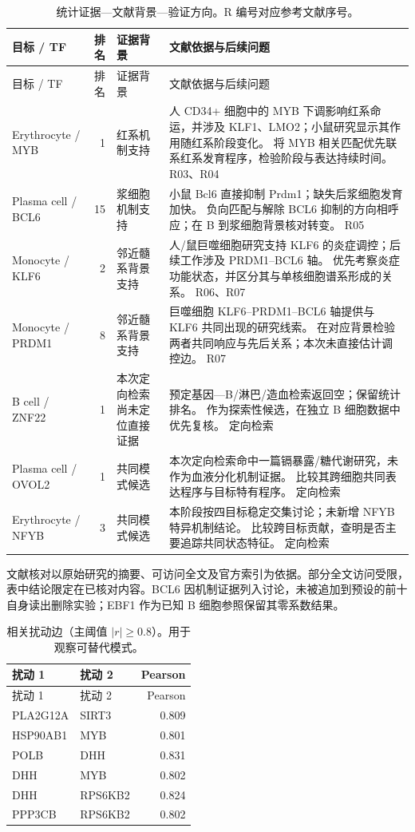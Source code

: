 {\footnotesize\linespread{1}\selectfont\setlength{\tabcolsep}{4pt}\renewcommand{\arraystretch}{1.08}\begin{longtable}{p{2.6cm}rp{2.6cm}p{9cm}}\caption{统计证据—文献背景—验证方向。R 编号对应参考文献序号。}\\\toprule 目标 / TF & 排名 & 证据背景 & 文献依据与后续问题\\\midrule\endfirsthead\toprule 目标 / TF & 排名 & 证据背景 & 文献依据与后续问题\\\midrule\endhead
Erythrocyte / MYB & 1 & 红系机制支持 & 人 CD34+ 细胞中的 MYB 下调影响红系命运，并涉及 KLF1、LMO2；小鼠研究显示其作用随红系阶段变化。 将 MYB 相关匹配优先联系红系发育程序，检验阶段与表达持续时间。 R03、R04\\
Plasma cell / BCL6 & 15 & 浆细胞机制支持 & 小鼠 Bcl6 直接抑制 Prdm1；缺失后浆细胞发育加快。 负向匹配与解除 BCL6 抑制的方向相呼应；在 B 到浆细胞背景核对转变。 R05\\
Monocyte / KLF6 & 2 & 邻近髓系背景支持 & 人/鼠巨噬细胞研究支持 KLF6 的炎症调控；后续工作涉及 PRDM1–BCL6 轴。 优先考察炎症功能状态，并区分其与单核细胞谱系形成的关系。 R06、R07\\
Monocyte / PRDM1 & 8 & 邻近髓系背景支持 & 巨噬细胞 KLF6–PRDM1–BCL6 轴提供与 KLF6 共同出现的研究线索。 在对应背景检验两者共同响应与先后关系；本次未直接估计调控边。 R07\\
B cell / ZNF22 & 1 & 本次定向检索尚未定位直接证据 & 预定基因—B/淋巴/造血检索返回空；保留统计排名。 作为探索性候选，在独立 B 细胞数据中优先复核。 定向检索\\
Plasma cell / OVOL2 & 1 & 共同模式候选 & 本次定向检索命中一篇镉暴露/糖代谢研究，未作为血液分化机制证据。 比较其跨细胞共同表达程序与目标特有程序。 定向检索\\
Erythrocyte / NFYB & 3 & 共同模式候选 & 本阶段按四目标稳定交集讨论；未新增 NFYB 特异机制结论。 比较跨目标贡献，查明是否主要追踪共同状态特征。 定向检索\\
\bottomrule\end{longtable}}
文献核对以原始研究的摘要、可访问全文及官方索引为依据。部分全文访问受限，表中结论限定在已核对内容。BCL6 因机制证据列入讨论，未被追加到预设的前十自身读出删除实验；EBF1 作为已知 B 细胞参照保留其零系数结果。
{\footnotesize\linespread{1}\selectfont\setlength{\tabcolsep}{4pt}\renewcommand{\arraystretch}{1.08}\begin{longtable}{llr}\caption{相关扰动边（主阈值 $|r|\geq0.8$）。用于观察可替代模式。}\\\toprule 扰动 1 & 扰动 2 & Pearson\\\midrule\endfirsthead\toprule 扰动 1 & 扰动 2 & Pearson\\\midrule\endhead
PLA2G12A & SIRT3 & 0.809\\
HSP90AB1 & MYB & 0.801\\
POLB & DHH & 0.831\\
DHH & MYB & 0.802\\
DHH & RPS6KB2 & 0.824\\
PPP3CB & RPS6KB2 & 0.802\\
\bottomrule\end{longtable}}
